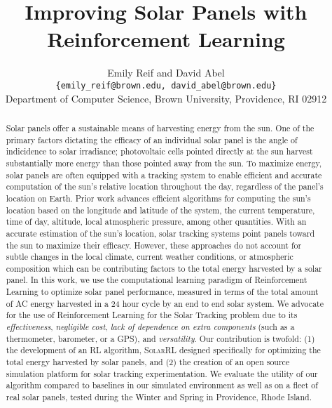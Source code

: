 \documentclass[11pt]{article}
\title{Improving Solar Panels with Reinforcement Learning}
\author{Emily Reif  and David Abel \\ \texttt{\{emily\_reif@brown.edu, david\_abel@brown.edu\}} \\ Department of Computer Science, Brown University, Providence, RI 02912 }
\date{}
\begin{document}
\maketitle

\begin{abstract}
Solar panels offer a sustainable means of harvesting energy from the sun. One of the primary factors dictating the efficacy of an individual solar panel is the angle of indicidence to solar irradiance; photovoltaic cells pointed directly at the sun harvest substantially more energy than those pointed away from the sun. To maximize energy, solar panels are often equipped with a tracking system to enable efficient and accurate computation of the sun's relative location throughout the day, regardless of the panel's location on Earth. Prior work advances efficient algorithms for computing the sun's location based on the longitude and latitude of the system, the current temperature, time of day, altitude, local atmospheric pressure, among other quantities. With an accurate estimation of the sun's location, solar tracking systems point panels toward the sun to maximize their efficacy. However, these approaches do not account for subtle changes in the local climate, current weather conditions, or atmospheric composition which can be contributing factors to the total energy harvested by a solar panel. In this work, we use the computational learning paradigm of Reinforcement Learning to optimize solar panel performance, measured in terms of the total amount of AC energy harvested in a 24 hour cycle by an end to end solar system. We advocate for the use of Reinforcement Learning for the Solar Tracking problem due to its {\it effectiveness}, {\it negligible cost}, {\it lack of dependence on extra components} (such as a thermometer, barometer, or a GPS), and {\it versatility}. Our contribution is twofold: (1) the development of an RL algorithm, \textsc{SolarRL} designed specifically for optimizing the total energy harvested by solar panels, and (2) the creation of an open source simulation platform for solar tracking experimentation. We evaluate the utility of our algorithm compared to baselines in our simulated environment as well as on a fleet of real solar panels, tested during the Winter and Spring in Providence, Rhode Island.
\end{abstract}

\end{document}
